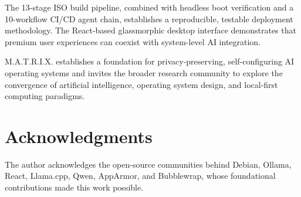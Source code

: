 \documentclass[conference]{IEEEtran}
\begin{document}
The 13-stage ISO build pipeline, combined with headless boot verification and a 10-workflow CI/CD agent chain, establishes a reproducible, testable deployment methodology. The React-based glassmorphic desktop interface demonstrates that premium user experiences can coexist with system-level AI integration.

M.A.T.R.I.X. establishes a foundation for privacy-preserving, self-configuring AI operating systems and invites the broader research community to explore the convergence of artificial intelligence, operating system design, and local-first computing paradigms.


\section*{Acknowledgments}

The author acknowledges the open-source communities behind Debian, Ollama, React, Llama.cpp, Qwen, AppArmor, and Bubblewrap, whose foundational contributions made this work possible.

\end{document}
